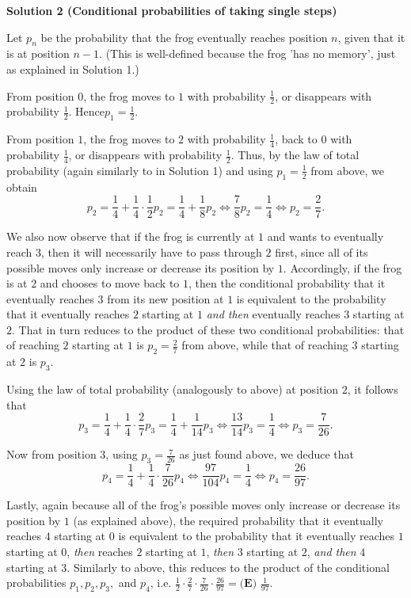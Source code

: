 \begin{enumerate}
 



\textbf{Solution 2 (Conditional probabilities of taking single steps)}

Let $p_n$ be the probability that the frog eventually reaches position $n$, given that it is at position $n-1$. (This is well-defined because the frog 'has no memory', just as explained in Solution 1.)

 From position $0$, the frog moves to $1$ with probability $\frac{1}{2}$, or disappears with probability $\frac{1}{2}$. Hence$p_1 = \frac{1}{2}$.

 From position $1$, the frog moves to $2$ with probability $\frac{1}{4}$, back to $0$ with probability $\frac{1}{4}$, or disappears with probability $\frac{1}{2}$. Thus, by the law of total probability (again similarly to in Solution 1) and using $p_1 = \frac{1}{2}$ from above, we obtain
 \[p_2 = \frac{1}{4} + \frac{1}{4} \cdot \frac{1}{2} p_2 = \frac{1}{4} + \frac{1}{8} p_2 \iff \frac{7}{8} p_2 = \frac{1}{4} \iff p_2 = \frac{2}{7}.\]

 
We also now observe that if the frog is currently at $1$ and wants to eventually reach $3$, then it will necessarily have to pass through $2$ first, since all of its possible moves only increase or decrease its position by $1$. Accordingly, if the frog is at $2$ and chooses to move back to $1$, then the conditional probability that it eventually reaches $3$ from its new position at $1$ is equivalent to the probability that it eventually reaches $2$ starting at $1$ \textit{and then} eventually reaches $3$ starting at $2$. That in turn reduces to the product of these two conditional probabilities: that of reaching $2$ starting at $1$ is $p_2 = \frac{2}{7}$ from above, while that of reaching $3$ starting at $2$ is $p_3$.

 Using the law of total probability (analogously to above) at position $2$, it follows that
 \[p_3 = \frac{1}{4} + \frac{1}{4} \cdot \frac{2}{7} p_3 = \frac{1}{4} + \frac{1}{14} p_3 \iff \frac{13}{14} p_3 = \frac{1}{4} \iff p_3 = \frac{7}{26}.\]

 Now from position 3, using $p_3 = \frac{7}{26}$ as just found above, we deduce that
 \[p_4 = \frac{1}{4} + \frac{1}{4} \cdot \frac{7}{26} p_4 \iff \frac{97}{104} p_4 = \frac{1}{4} \iff p_4 = \frac{26}{97}.\]

 Lastly, again because all of the frog's possible moves only increase or decrease its position by $1$ (as explained above), the required probability that it eventually reaches $4$ starting at $0$ is equivalent to the probability that it eventually reaches $1$ starting at $0$, \textit{then} reaches $2$ starting at $1$, \textit{then} $3$ starting at $2$, \textit{and then} $4$ starting at $3$. Similarly to above, this reduces to the product of the conditional probabilities $p_1, p_2, p_3,$ and $p_4$, i.e. $\frac{1}{2} \cdot \frac{2}{7} \cdot \frac{7}{26} \cdot \frac{26}{97} = \boxed{ \textbf{(E) } \frac{1}{97}}.$





\end{enumerate}
